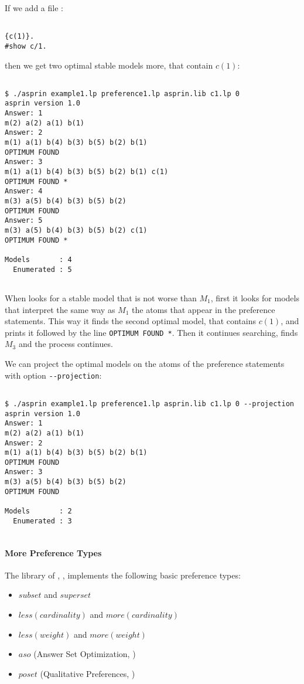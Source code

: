 If we add a file : 
\begin{lstlisting}[numbers=none]

{c(1)}.
#show c/1.
\end{lstlisting}
then we get two optimal stable models more, that contain $c(1)$: 
\begin{lstlisting}[numbers=none]

$ ./asprin example1.lp preference1.lp asprin.lib c1.lp 0
asprin version 1.0
Answer: 1
m(2) a(2) a(1) b(1)
Answer: 2
m(1) a(1) b(4) b(3) b(5) b(2) b(1)
OPTIMUM FOUND
Answer: 3
m(1) a(1) b(4) b(3) b(5) b(2) b(1) c(1)
OPTIMUM FOUND *
Answer: 4
m(3) a(5) b(4) b(3) b(5) b(2)
OPTIMUM FOUND
Answer: 5
m(3) a(5) b(4) b(3) b(5) b(2) c(1)
OPTIMUM FOUND *

Models       : 4
  Enumerated : 5
  
\end{lstlisting}
When \asprin looks for a stable model that is not worse than $M_1$,  
first it looks for models that interpret the same way as $M_1$ the atoms that appear in the preference statements. 
This way it finds the second optimal model, that contains $c(1)$, and prints it followed by the line \lstinline{OPTIMUM FOUND *}.  
Then it continues searching, finds $M_3$ and the process continues. 

We can project the optimal models on the atoms of the preference statements with option \lstinline{--projection}: 
\begin{lstlisting}[numbers=none]

$ ./asprin example1.lp preference1.lp asprin.lib c1.lp 0 --projection
asprin version 1.0
Answer: 1
m(2) a(2) a(1) b(1)
Answer: 2
m(1) a(1) b(4) b(3) b(5) b(2) b(1)
OPTIMUM FOUND
Answer: 3
m(3) a(5) b(4) b(3) b(5) b(2)
OPTIMUM FOUND

Models       : 2
  Enumerated : 3
  
\end{lstlisting}

\paragraph{More Preference Types}

The library of \asprin, , implements the following basic preference types:  
\begin{itemize}
	\item  $subset$ and $superset$   
	\item  $less(cardinality)$ and $more(cardinality)$   
	\item  $less(weight)$ and $more(weight)$   
	\item  $aso$   (Answer Set Optimization, \cite{brnitr03a})   
	\item  $poset$ (Qualitative Preferences, \cite{rogima10a})  
\end{itemize}

